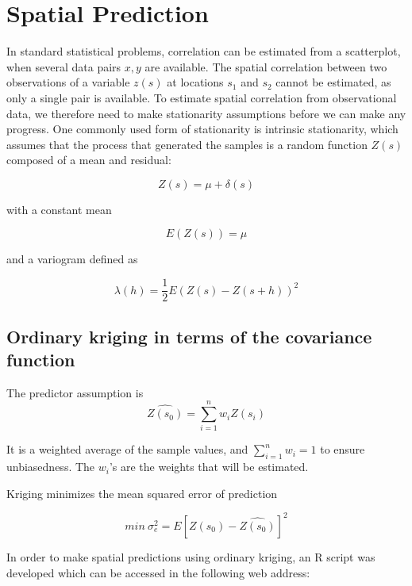 \documentclass[11pt,twoside]{rmta2010esp}%
\begin{document}
\section{Spatial Prediction}
In standard statistical problems, correlation can be estimated from a scatterplot, when several data pairs ${x, y}$ are available. The spatial correlation between two observations of a variable $z(s)$ at locations $s_{1}$ and $s_{2}$ cannot be estimated, as only a single pair is available. To estimate spatial correlation
from observational data, we therefore need to make stationarity assumptions
before we can make any progress. One commonly used form of stationarity
is intrinsic stationarity, which assumes that the process that generated the
samples is a random function $Z(s)$ composed of a mean and residual:

\begin{equation}
Z(s) = \mu + \delta(s)
\end{equation}

with a constant mean 

\begin{equation}
E\left(Z(s)\right) = \mu
\end{equation}

and a variogram defined as 

\begin{equation}
\lambda(h) = \frac{1}{2}E\left(Z(s) - Z(s+h)\right)^{2}
\end{equation}


\subsection*{Ordinary kriging in terms of the covariance function}
The predictor assumption is 
\begin{equation}
\hat{Z(s_{0})} = \sum_{i=1}^{n} w_{i}Z(s_{i})
\end{equation}

It is a weighted average of the sample values, and $ \sum_{i=1}^{n} w_{i} = 1 $ to ensure unbiasedness. The $w_{i}$'s are the weights that will be estimated. 
  
Kriging minimizes the mean squared error of prediction 

\begin{equation}
min \ \sigma_{e}^{2} = E\left[Z(s_{0}) - \hat{Z(s_{0})}\right]^{2}
\end{equation}  

In order to make spatial predictions using ordinary kriging, an R script was developed which can be accessed in the following web address: 
\end{document}
